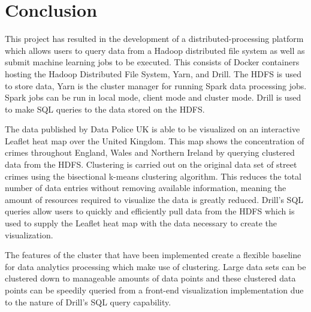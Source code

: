 \documentclass[main.tex]{subfiles}
\begin{document}
\section{Conclusion}

This project has resulted in the development of a distributed-processing platform which allows users to query data from a Hadoop distributed file system as well as submit machine learning jobs to be executed. This consists of Docker containers hosting the Hadoop Distributed File System, Yarn, and Drill. The HDFS is used to store data, Yarn is the cluster manager for running Spark data processing jobs. Spark jobs can be run in local mode, client mode and cluster mode. Drill is used to make SQL queries to the data stored on the HDFS.

The data published by Data Police UK is able to be visualized on an interactive Leaflet heat map over the United Kingdom. This map shows the concentration of crimes throughout England, Wales and Northern Ireland by querying clustered data from the HDFS. Clustering is carried out on the original data set of street crimes using the bisectional k-means clustering algorithm. This reduces the total number of data entries without removing available information, meaning the amount of resources required to visualize the data is greatly reduced. Drill's SQL queries allow users to quickly and efficiently pull data from the HDFS which is used to supply the Leaflet heat map with the data necessary to create the visualization. 

The features of the cluster that have been implemented create a flexible baseline for data analytics processing which make use of clustering. Large data sets can be clustered down to manageable amounts of data points and these clustered data points can be speedily queried from a front-end visualization implementation due to the nature of Drill's SQL query capability. 
\end{document}
